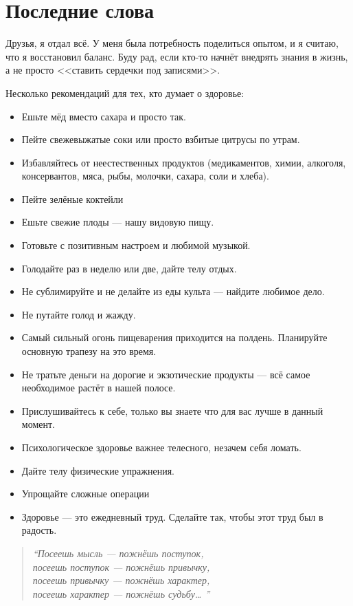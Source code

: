 \section{Последние слова}

Друзья, я отдал всё. У меня была потребность поделиться опытом, и я считаю, что я восстановил баланс. Буду рад, если кто-то начнёт внедрять знания в жизнь, а не просто <<ставить сердечки под записями>>. 

Несколько рекомендаций для тех, кто думает о здоровье:
\begin{itemize}
\item Ешьте мёд вместо сахара и просто так.
\item Пейте свежевыжатые соки или просто взбитые цитрусы по утрам.
\item  Избавляйтесь от неестественных продуктов (медикаментов, химии, алкоголя, консервантов, мяса, рыбы, молочки, сахара, соли и хлеба).
\item Пейте зелёные коктейли
\item  Ешьте свежие плоды — нашу видовую пищу.
\item Готовьте с позитивным настроем и любимой музыкой.
\item Голодайте раз в неделю или две, дайте телу отдых.
\item  Не сублимируйте и не делайте из еды культа — найдите любимое дело.
\item Не путайте голод и жажду. 
\item Самый сильный огонь пищеварения приходится на полдень. Планируйте основную трапезу на это время.
\item Не тратьте деньги на дорогие и экзотические продукты — всё самое необходимое растёт в нашей полосе.
\item  Прислушивайтесь к себе, только вы знаете что для вас лучше в данный момент.
\item Психологическое здоровье важнее телесного, незачем себя ломать.
\item Дайте телу физические упражнения.
\item Упрощайте сложные операции
\item Здоровье — это ежедневный труд. Сделайте так, чтобы этот труд был в радость.
\end{itemize}

\begin{quote}
    \centering
\emph{%
``Посеешь мысль — пожнёшь поступок,
\\
посеешь поступок — пожнёшь привычку,
\\
посеешь привычку — пожнёшь характер,
\\
посеешь характер — пожнёшь судьбу\ldots%
''
\\[5pt]
}
\end{quote}


